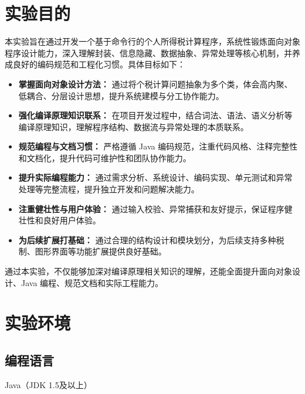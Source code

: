 

\chapter{实验目的}
本实验旨在通过开发一个基于命令行的个人所得税计算程序，系统性锻炼面向对象程序设计能力，深入理解封装、信息隐藏、数据抽象、异常处理等核心机制，并养成良好的编码规范和工程化习惯。具体目标如下：
\begin{itemize}
	\item \textbf{掌握面向对象设计方法：} 通过将个税计算问题抽象为多个类，体会高内聚、低耦合、分层设计思想，提升系统建模与分工协作能力。
	\item \textbf{强化编译原理知识联系：} 在项目开发过程中，结合词法、语法、语义分析等编译原理知识，理解程序结构、数据流与异常处理的本质联系。
	\item \textbf{规范编程与文档习惯：} 严格遵循 Java 编码规范，注重代码风格、注释完整性和文档化，提升代码可维护性和团队协作能力。
	\item \textbf{提升实际编程能力：} 通过需求分析、系统设计、编码实现、单元测试和异常处理等完整流程，提升独立开发和问题解决能力。
	\item \textbf{注重健壮性与用户体验：} 通过输入校验、异常捕获和友好提示，保证程序健壮性和良好用户体验。
	\item \textbf{为后续扩展打基础：} 通过合理的结构设计和模块划分，为后续支持多种税制、图形界面等功能扩展提供良好基础。
\end{itemize}
通过本实验，不仅能够加深对编译原理相关知识的理解，还能全面提升面向对象设计、Java 编程、规范文档和实际工程能力。

\chapter{实验环境}
\section{编程语言}
Java（JDK 1.5及以上）
